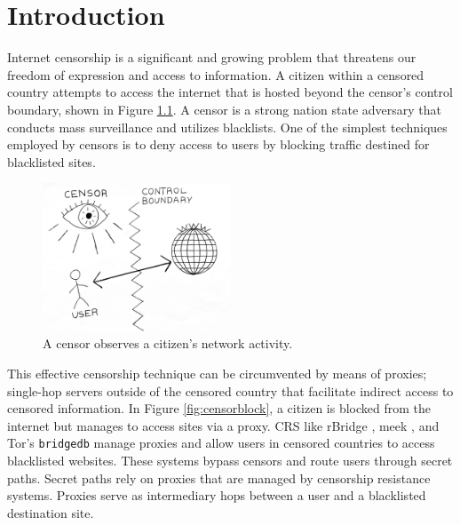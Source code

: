 \chapter{Introduction}
\label{sec:intro} 

Internet censorship is a significant and growing problem that threatens our freedom of expression and access to information. A citizen within a censored country attempts to access the internet that is hosted beyond the censor's control boundary, shown in Figure \ref{fig:simplecensor}. A censor is a strong nation state adversary that conducts mass surveillance and utilizes blacklists. One of the simplest techniques employed by censors is to deny access to users by blocking traffic destined for blacklisted sites. 

\begin{figure}[h!]
\centering
     \includegraphics[width=0.5\textwidth]{fig/censor_simple_new.png}
    \caption{A censor observes a citizen's network activity.}
    
    \label{fig:simplecensor}
\end{figure}

This effective censorship technique can be circumvented by means of proxies; single-hop servers outside of the censored country that facilitate indirect access to censored information. In Figure \ref{fig:censorblock}, a citizen is blocked from the internet but manages to access sites via a proxy. \ac{CRS} like rBridge \cite{wang2013rbridge}, meek \cite{Fifield2017a}, and Tor's \texttt{bridgedb} \cite{BridgeDB:2019} manage proxies and allow users in censored countries to access blacklisted websites. These systems bypass censors and route users through secret paths. Secret paths rely on proxies that are managed by censorship resistance systems. Proxies serve as intermediary hops between a user and a blacklisted destination site.

